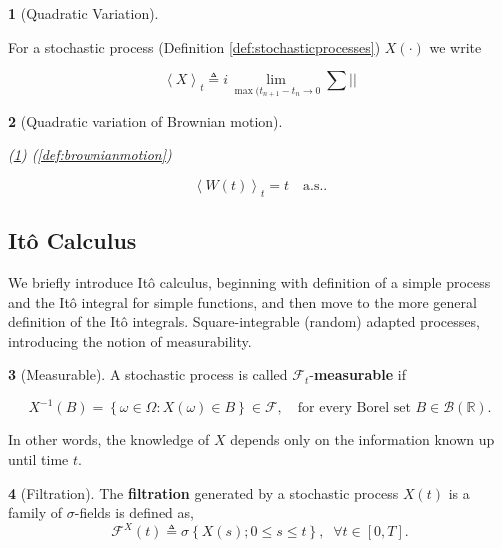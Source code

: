 \documentclass[british]{amsart}
\numberwithin{equation}{section}
\numberwithin{figure}{section}
\theoremstyle{plain}
\newtheorem{thm}{\protect\theoremname}[section]
\theoremstyle{definition}
\newtheorem{defn}[thm]{\protect\definitionname}
\theoremstyle{plain}
\theoremstyle{plain}
\theoremstyle{plain}
\theoremstyle{remark}
\theoremstyle{plain}
\providecommand{\definitionname}{Definition}
\providecommand{\theoremname}{Theorem}
\newcommand{\defeq}{\mathop{\triangleq}}
\newcommand{\almostsurely}{\text{a.s.}}
\begin{document}
\begin{defn} [Quadratic Variation]
	\label{def:quadraticvariation}

	For a stochastic process (Definition \ref{def:stochasticprocesses}) $X(\cdot)$ we write

	\begin{equation*}
		\left< X \right>_{t} \defeq i
			\lim_{\max{(t_{n+1}-t_{n}}\to0}
			\sum \left| \right|
	\end{equation*}

\end{defn}

\begin{thm} [Quadratic variation of Brownian motion]
	\label{thm:quadraticvariationofbrownianmotion}

	(\ref{def:quadraticvariation})
	(\ref{def:brownianmotion})

	\begin{equation}
		\left<W(t)\right>_{t} = t \quad \almostsurely.
	\end{equation}

\end{thm}

\subsection{It\^{o} Calculus}

We briefly introduce It\^{o} calculus, beginning with definition of a
simple process and the It\^{o} integral for simple functions, and
then move to the more general definition of the It\^{o} integrals. 
Square-integrable (random) adapted processes, introducing the notion of 
measurability. 

\begin{defn} [Measurable]
	A stochastic process is called $\mathcal{F}_{t}$-\textbf{measurable} if 

	\begin{equation*}
		X^{-1}(B) =\left\{ \omega\in\Omega:X(\omega)\in B \right\} \in \mathcal{F}, \quad \text{for every Borel set }B\in\mathcal{B}(\mathbb{R}).
	\end{equation*}

	In other words, the knowledge of $X$ depends only on the information 
  known up until time $t$.
\end{defn}

\begin{defn} [Filtration]
	The \textbf{filtration} generated by a stochastic process $X(t)$
	is a family of $\sigma$-fields is defined as, 
	\[
	\mathcal{F}^{X}(t)\triangleq\sigma\left\{ X(s);0\le s\le t\right\} ,\;\;\forall t\in[0,T].
	\]
\end{defn}
\end{document}
